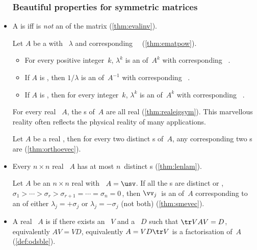 \begin{itemize}
\subsubsection{Beautiful properties for symmetric matrices}

\item A  is  iff  is \emph{not} an  of the matrix (\autoref{thm:evalinv}).

\itemme Let \(A\) be a  with ~\(\lambda\) and corresponding ~\xv\ (\autoref{thm:ematpow}).
\begin{itemize}
\item For every positive integer~\(k\), \(\lambda^k\) is an  of~\(A^k\) with corresponding ~\xv.
\item If \(A\) is , then \(1/\lambda\) is an  of~\(A^{-1}\) with corresponding ~\xv.
\item If \(A\) is , then for every integer~\(k\), \(\lambda^k\) is an  of~\(A^k\) with corresponding ~\xv.
\end{itemize}

\itemhi For every real ~\(A\), the s of~\(A\) are all real (\autoref{thm:realeigsym}).
This marvellous reality often reflects the physical reality of many applications.

\itemme Let \(A\) be a real , then for every two distinct s of~\(A\), any corresponding two s are  (\autoref{thm:orthoevec}).

\item Every \(n\times n\) real ~\(A\) has at most \(n\)~distinct s (\autoref{thm:lenlam}).

\itemme Let \(A\) be an \(n\times n\) real  with \svd\ \(A=\usv\).
If all the s are distinct or , \(\sigma_1>\cdots>\sigma_r>\sigma_{r+1}=\cdots=\sigma_n=0\)\,, then \(\vv_j\)~is an  of~\(A\) corresponding to an  of either \(\lambda_j=+\sigma_j\) or \(\lambda_j=-\sigma_j\) (not both)  (\autoref{thm:smevec}).

\item A real ~\(A\) is  if there exists an ~\(V\) and a ~\(D\) such that \(\tr VAV=D\), equivalently \(AV=VD\), equivalently \(A=VD\tr V\) is a factorisation of~\(A\) (\autoref{def:odsble}).


\end{itemize}

